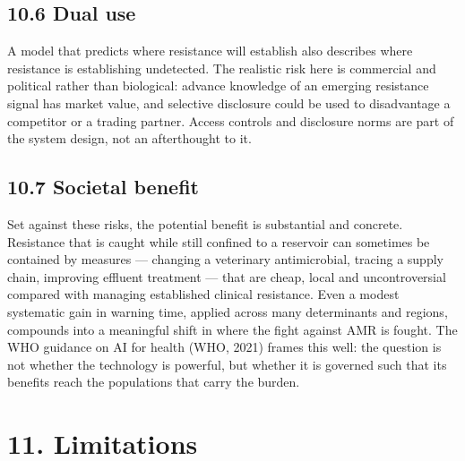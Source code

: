 \documentclass[11pt,a4paper]{article}
\begin{document}
\subsection*{10.6 Dual use}

A model that predicts where resistance will establish also describes where resistance is establishing undetected. The realistic risk here is commercial and political rather than biological: advance knowledge of an emerging resistance signal has market value, and selective disclosure could be used to disadvantage a competitor or a trading partner. Access controls and disclosure norms are part of the system design, not an afterthought to it.

\subsection*{10.7 Societal benefit}

Set against these risks, the potential benefit is substantial and concrete. Resistance that is caught while still confined to a reservoir can sometimes be contained by measures — changing a veterinary antimicrobial, tracing a supply chain, improving effluent treatment — that are cheap, local and uncontroversial compared with managing established clinical resistance. Even a modest systematic gain in warning time, applied across many determinants and regions, compounds into a meaningful shift in where the fight against AMR is fought. The WHO guidance on AI for health (WHO, 2021) frames this well: the question is not whether the technology is powerful, but whether it is governed such that its benefits reach the populations that carry the burden.

\section*{11. Limitations}
\end{document}
